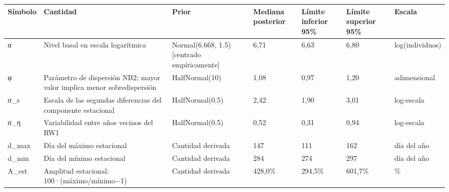 \begin{tabular}{lllllll}
\toprule
Símbolo & Cantidad & Prior & Mediana posterior & Límite inferior 95\% & Límite superior 95\% & Escala \\
\midrule
α & Nivel basal en escala logarítmica & Normal(6.668, 1.5) [centrado empíricamente] & 6,71 & 6,63 & 6,80 & log(individuos) \\
φ & Parámetro de dispersión NB2; mayor valor implica menor sobredispersión & HalfNormal(10) & 1,08 & 0,97 & 1,20 & adimensional \\
σ\_s & Escala de las segundas diferencias del componente estacional & HalfNormal(0.5) & 2,42 & 1,90 & 3,01 & log-escala \\
σ\_η & Variabilidad entre años vecinos del RW1 & HalfNormal(0.5) & 0,52 & 0,31 & 0,94 & log-escala \\
d\_max & Día del máximo estacional & Cantidad derivada & 147 & 111 & 162 & día del año \\
d\_min & Día del mínimo estacional & Cantidad derivada & 284 & 274 & 297 & día del año \\
A\_est & Amplitud estacional: 100·(máximo/mínimo−1) & Cantidad derivada & 428,0\% & 294,5\% & 601,7\% & \% \\
\bottomrule
\end{tabular}
